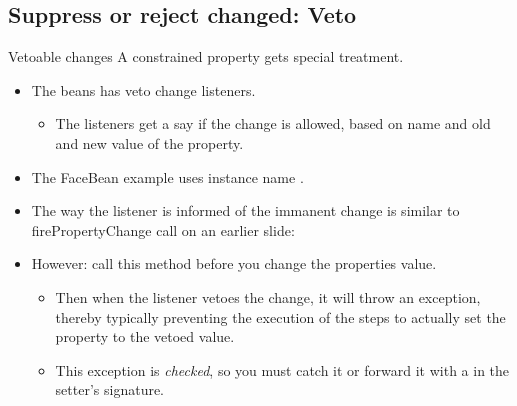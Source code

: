 \subsection[veto]{Suppress or reject changed: Veto}
\begin{frame}{Vetoable changes}
  A constrained property gets special treatment.
  \begin{itemize}
  \item The beans has veto change listeners.
    \begin{itemize}
    \item The listeners get a say if the change is allowed, based on
      name and old and new value of the property.
    \end{itemize}
  \item The FaceBean example uses  instance name .
  \item The way the listener is informed of the immanent change is
    similar to firePropertyChange call on an earlier slide:
  \item However: call this method \alert{before} you change the
    properties value.
    \begin{itemize}
    \item Then when the listener vetoes the change, it will throw an
      exception, thereby typically preventing the execution of the
      steps to actually set the property to the vetoed value.
    \item This exception is \textit{checked}, so you must catch it
      or forward it with a  in the setter's signature.
    \end{itemize}
  \end{itemize}
\end{frame}

